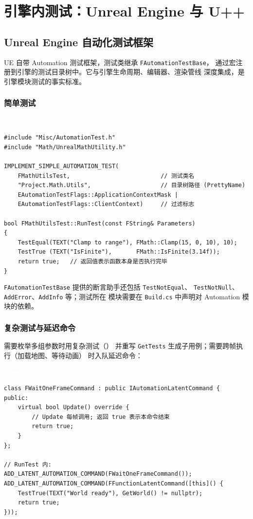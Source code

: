 \documentclass[12pt,a4paper,fontset=fandol]{ctexbook}
\newcommand{\cpplabel}{%
  \begin{tcolorbox}[enhanced,colback=cppheadbg,colframe=cppheadbg,
    arc=1mm,boxrule=0mm,left=6pt,right=6pt,top=2pt,bottom=2pt,
    halign=left,oversize]
    \textcolor{white}{\small\bfseries C++}
  \end{tcolorbox}\vspace{-4pt}}
\begin{document}
\chapter{引擎内测试：Unreal Engine 与 U++}

\section{Unreal Engine 自动化测试框架}

UE 自带 Automation 测试框架，测试类继承 \texttt{FAutomationTestBase}，
通过宏注册到引擎的测试目录树中。它与引擎生命周期、编辑器、渲染管线
深度集成，是引擎模块测试的事实标准。

\subsection{简单测试}

\cpplabel
\begin{lstlisting}
#include "Misc/AutomationTest.h"
#include "Math/UnrealMathUtility.h"

IMPLEMENT_SIMPLE_AUTOMATION_TEST(
    FMathUtilsTest,                          // 测试类名
    "Project.Math.Utils",                    // 目录树路径 (PrettyName)
    EAutomationTestFlags::ApplicationContextMask |
    EAutomationTestFlags::ClientContext)     // 过滤标志

bool FMathUtilsTest::RunTest(const FString& Parameters)
{
    TestEqual(TEXT("Clamp to range"), FMath::Clamp(15, 0, 10), 10);
    TestTrue (TEXT("IsFinite"),       FMath::IsFinite(3.14f));
    return true;   // 返回值表示函数本身是否执行完毕
}
\end{lstlisting}

\texttt{FAutomationTestBase} 提供的断言助手还包括 \texttt{TestNotEqual}、
\texttt{TestNotNull}、\texttt{AddError}、\texttt{AddInfo} 等；测试所在
模块需要在 \texttt{Build.cs} 中声明对 Automation 模块的依赖。

\subsection{复杂测试与延迟命令}

需要枚举多组参数时用复杂测试（）
并重写 \texttt{GetTests} 生成子用例；需要跨帧执行（加载地图、等待动画）
时入队延迟命令：

\cpplabel
\begin{lstlisting}
class FWaitOneFrameCommand : public IAutomationLatentCommand {
public:
    virtual bool Update() override {
        // Update 每帧调用; 返回 true 表示本命令结束
        return true;
    }
};

// RunTest 内:
ADD_LATENT_AUTOMATION_COMMAND(FWaitOneFrameCommand());
ADD_LATENT_AUTOMATION_COMMAND(FFunctionLatentCommand([this]() {
    TestTrue(TEXT("World ready"), GetWorld() != nullptr);
    return true;
}));
\end{lstlisting}
\end{document}
